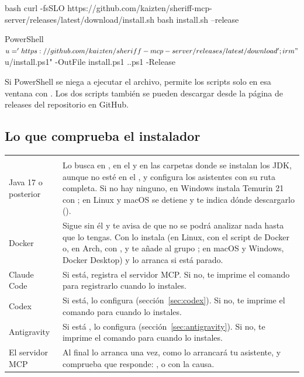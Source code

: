 \documentclass[11pt,a4paper]{article}
\begin{document}
\begin{command}[basicstyle=\ttfamily\scriptsize]{bash}
curl -fsSLO https://github.com/kaizten/sheriff-mcp-server/releases/latest/download/install.sh
bash install.sh --release
\end{command}

\begin{command}[basicstyle=\ttfamily\footnotesize]{PowerShell}
$u = 'https://github.com/kaizten/sheriff-mcp-server/releases/latest/download';
irm "$u/install.ps1" -OutFile install.ps1
.\install.ps1 -Release
\end{command}

Si PowerShell se niega a ejecutar el archivo, permite los scripts solo en esa
ventana con .
Los dos scripts también se pueden descargar desde la página de releases del
repositorio en GitHub.

\subsection{Lo que comprueba el instalador}

\begin{center}
\begin{tabularx}{\linewidth}{@{\hspace{6pt}}K{33mm}L}
\headrow {} &  \\
Java 17 o posterior & Lo busca en , en el  y en
  las carpetas donde se instalan los JDK, aunque no esté en el , y
  configura los asistentes con su ruta completa. Si no hay ninguno, en Windows
  instala Temurin 21 con ; en Linux y macOS se detiene y te indica
  dónde descargarlo (). \\
Docker & Sigue sin él y te avisa de que no se podrá analizar nada hasta que lo
  tengas. Con  lo instala (en Linux, con el script de
  Docker o, en Arch, con , y te añade al grupo ; en
  macOS y Windows, Docker Desktop) y lo arranca si está parado. \\
Claude Code & Si está, registra el servidor MCP. Si no, te imprime el comando
  para registrarlo cuando lo instales. \\
Codex & Si está, lo configura (sección~\ref{sec:codex}). Si no, te imprime el
  comando para cuando lo instales. \\
Antigravity & Si está , lo configura (sección~\ref{sec:antigravity}).
  Si no, te imprime el comando para cuando lo instales. \\
El servidor MCP & Al final lo arranca una vez, como lo arrancará tu asistente,
  y comprueba que responde: , o  con la causa. \\
\end{tabularx}
\end{center}
\end{document}
